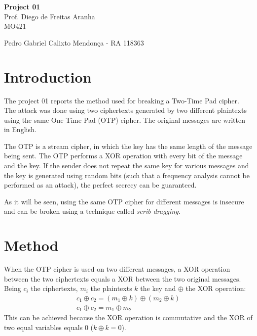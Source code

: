 \documentclass[a4paper,11pt]{article}
\begin{document}
\begin{center}
\textbf{Project 01}\\ \hspace{5pt}Prof. Diego de Freitas Aranha\\MO421
\end{center}

\begin{center}
Pedro Gabriel Calixto Mendon\c{c}a - RA 118363\\
\end{center}


\section{Introduction}
\hspace{14pt}

The project 01 reports the method used for breaking a Two-Time Pad cipher.
The attack was done using two ciphertexts generated by two different plaintexts
using the same One-Time Pad (OTP) cipher. The original messages are written
in English.

The OTP is a stream cipher, in which the key has the same length of the message
being sent. The OTP performs a XOR operation with every bit of the message and
the key. If the sender does not repeat the same key for various messages and the
key is generated using random bits (such that a frequency analysis cannot be
performed as an attack), the perfect secrecy can be guaranteed.

As it will be seen, using the same OTP cipher for different messages is insecure
and can be broken using a technique called \textit{scrib dragging}.

\section{Method} \label{method}
\hspace{14pt}

When the OTP cipher is used on two different messages, a XOR operation between
the two ciphertexts equals a XOR between the two original messages.
Being $c_i$ the ciphertexts, $m_i$ the plaintexts $k$ the key and $\oplus$ the XOR
operation:
\begin{gather*}
	c_1 \oplus c_2 = (m_1 \oplus k) \oplus (m_2 \oplus k) \\
	c_1 \oplus c_2 = m_1 \oplus m_2
\end{gather*}
This can be achieved because the XOR operation is commutative and the XOR of
two equal variables equals 0 ($k \oplus k = 0$).
\end{document}
